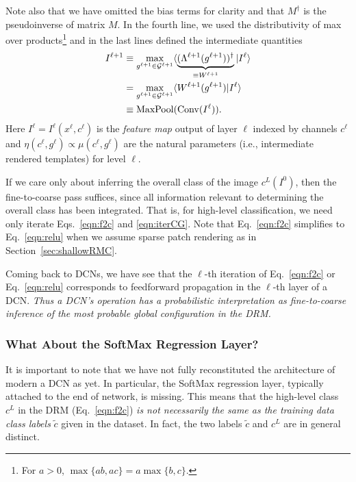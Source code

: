 \documentclass[12pt]{article}
\newcommand{\dg}[0]{{ \dagger }}
\newcommand{\G}[0]{{ \mathcal{G} }}
\begin{document}
Note also that we have omitted the bias terms for clarity and that $M^{\dg}$ is the pseudoinverse of matrix $M$. In the fourth line, we used the distributivity of max over products\footnote{ For $a > 0$, $\max \{ab,ac\} = a \max \{b,c\}$.} and in the last lines defined the intermediate quantities
\begin{align} 
	I^{\ell+1} &\equiv \max_{g^{\ell+1}\in \G^{\ell+1}} \langle \underbrace{(\Lambda^{\ell+1}(g^{\ell+1}))^{\dg}}_{\equiv W^{\ell+1}} | I^{\ell} \rangle \nonumber\\
		       &= \max_{g^{\ell+1}\in \G^{\ell+1}} \langle W^{\ell+1}(g^{\ell+1}) | I^{\ell} \rangle \nonumber\\
	               &\equiv {\rm MaxPool}({\rm Conv}(I^{\ell})).
	\label{eqn:iterCG}
\end{align}
Here $I^{\ell}=I^{\ell}(x^{\ell},c^{\ell})$ is the {\em feature map} output of layer $\ell$ indexed by channels $c^{\ell}$ and $\eta(c^{\ell},g^{\ell}) \propto \mu(c^{\ell}, g^{\ell})$ are the natural parameters (i.e., intermediate rendered templates) for level $\ell$. 

If we care only about inferring the overall class of the image $c^L(I^0)$, then the fine-to-coarse pass suffices, since all information relevant to determining the overall class has been integrated. That is, for high-level classification, we need only iterate Eqs.~\ref{eqn:f2c} and \ref{eqn:iterCG}. Note that Eq.~\ref{eqn:f2c} simplifies to Eq.~\ref{eqn:relu} when we assume sparse patch rendering as in Section~\ref{sec:shallowRMC}. 

Coming back to DCNs, we have see that the $\ell$-th iteration of Eq.~\ref{eqn:f2c} or Eq.~\ref{eqn:relu} corresponds to feedforward propagation in the $\ell$-th layer of a DCN. \textit{Thus a DCN's operation has a probabilistic interpretation as fine-to-coarse inference of the most probable global configuration in the DRM.}

\subsubsection{What About the SoftMax Regression Layer?} \label{sec:SoftMaxReg}

It is important to note that we have not fully reconstituted the architecture of modern a DCN as yet.
In particular, the SoftMax regression layer, typically attached to the end of network, is missing. This means that the high-level class $c^{L}$ in the DRM (Eq.~\ref{eqn:f2c}) \emph{is not necessarily the same as the training data class labels} $\tilde{c}$ given in the dataset. In fact, the two labels $\tilde{c}$ and $c^L$ are in general distinct. 
\end{document}
